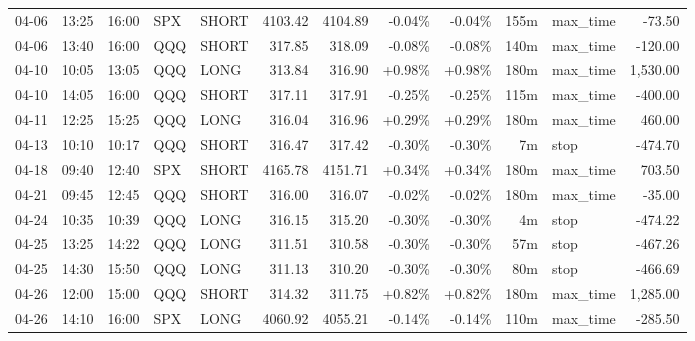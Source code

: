 \documentclass[11pt,a4paper,twoside]{article}
\begin{document}
\begin{center}
\begin{longtable}{>{\color{txtmain}}l l l l l r r r r r >{\color{txtmain}}l r}
04-06 & 13:25 & 16:00 & SPX & SHORT & 4103.42 & 4104.89 & \textcolor{lossred}{-0.04\%} & \textcolor{lossred}{-0.04\%} & 155m & max\_time & \textcolor{lossred}{-73.50} \\
04-06 & 13:40 & 16:00 & QQQ & SHORT & 317.85 & 318.09 & \textcolor{lossred}{-0.08\%} & \textcolor{lossred}{-0.08\%} & 140m & max\_time & \textcolor{lossred}{-120.00} \\
04-10 & 10:05 & 13:05 & QQQ & LONG & 313.84 & 316.90 & \textcolor{wingreen}{+0.98\%} & \textcolor{wingreen}{+0.98\%} & 180m & max\_time & \textcolor{wingreen}{1,530.00} \\
04-10 & 14:05 & 16:00 & QQQ & SHORT & 317.11 & 317.91 & \textcolor{lossred}{-0.25\%} & \textcolor{lossred}{-0.25\%} & 115m & max\_time & \textcolor{lossred}{-400.00} \\
04-11 & 12:25 & 15:25 & QQQ & LONG & 316.04 & 316.96 & \textcolor{wingreen}{+0.29\%} & \textcolor{wingreen}{+0.29\%} & 180m & max\_time & \textcolor{wingreen}{460.00} \\
04-13 & 10:10 & 10:17 & QQQ & SHORT & 316.47 & 317.42 & \textcolor{lossred}{-0.30\%} & \textcolor{lossred}{-0.30\%} & 7m & stop & \textcolor{lossred}{-474.70} \\
04-18 & 09:40 & 12:40 & SPX & SHORT & 4165.78 & 4151.71 & \textcolor{wingreen}{+0.34\%} & \textcolor{wingreen}{+0.34\%} & 180m & max\_time & \textcolor{wingreen}{703.50} \\
04-21 & 09:45 & 12:45 & QQQ & SHORT & 316.00 & 316.07 & \textcolor{lossred}{-0.02\%} & \textcolor{lossred}{-0.02\%} & 180m & max\_time & \textcolor{lossred}{-35.00} \\
04-24 & 10:35 & 10:39 & QQQ & LONG & 316.15 & 315.20 & \textcolor{lossred}{-0.30\%} & \textcolor{lossred}{-0.30\%} & 4m & stop & \textcolor{lossred}{-474.22} \\
04-25 & 13:25 & 14:22 & QQQ & LONG & 311.51 & 310.58 & \textcolor{lossred}{-0.30\%} & \textcolor{lossred}{-0.30\%} & 57m & stop & \textcolor{lossred}{-467.26} \\
04-25 & 14:30 & 15:50 & QQQ & LONG & 311.13 & 310.20 & \textcolor{lossred}{-0.30\%} & \textcolor{lossred}{-0.30\%} & 80m & stop & \textcolor{lossred}{-466.69} \\
04-26 & 12:00 & 15:00 & QQQ & SHORT & 314.32 & 311.75 & \textcolor{wingreen}{+0.82\%} & \textcolor{wingreen}{+0.82\%} & 180m & max\_time & \textcolor{wingreen}{1,285.00} \\
04-26 & 14:10 & 16:00 & SPX & LONG & 4060.92 & 4055.21 & \textcolor{lossred}{-0.14\%} & \textcolor{lossred}{-0.14\%} & 110m & max\_time & \textcolor{lossred}{-285.50} \\

\end{longtable}
\end{center}
\end{document}
